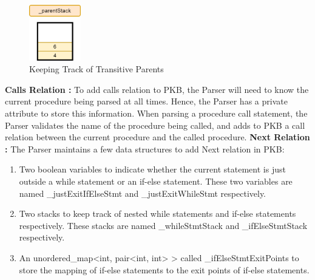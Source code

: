 \documentclass[12pt]{article}
\begin{document}
\begin{figure}[htbp]
  \caption{Keeping Track of Transitive Parents}
  \centering
    \includegraphics[width=0.2\textwidth]{Parser_AddingParentRelationToPKB.png}
\end{figure}
\textbf{Calls Relation
:} To add calls relation to PKB, the Parser will need to know the current procedure being parsed at all times. Hence, the Parser has a private attribute to store this information. When parsing a procedure call statement, the Parser validates the name of the procedure being called, and adds to PKB a call relation between the current procedure and the called procedure.\newline
\textbf{Next Relation
:} The Parser maintains a few data structures to add Next relation in PKB: 
\begin{enumerate}
\item Two boolean variables to indicate whether the current statement is just outside a while statement or an if-else statement. These two variables are named \_justExitIfElseStmt and \_justExitWhileStmt respectively.
\item Two stacks to keep track of nested while statements and if-else statements respectively. These stacks are named \_whileStmtStack and \_ifElseStmtStack respectively.
\item An unordered\_map<int, pair<int, int> > called \_ifElseStmtExitPoints to store the mapping of if-else statements to the exit points of if-else statements.
\end{enumerate}
\begin{center}
\end{center}
\end{document}
